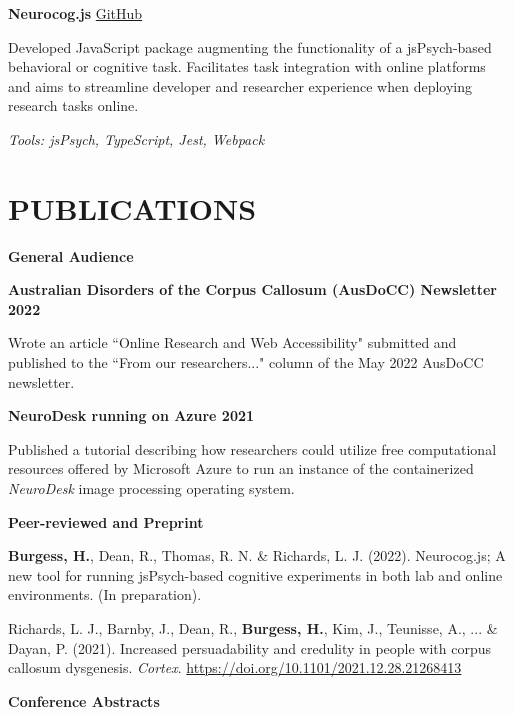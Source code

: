 \documentclass{article}
\begin{document}
  \medbreak

  \textbf{Neurocog.js} \hfill \href{https://github.com/Brain-Development-and-Disorders-Lab/Neurocog.js}{\color{blue}GitHub}

  Developed JavaScript package augmenting the functionality of a jsPsych-based behavioral or cognitive task. Facilitates task integration with online platforms and aims to streamline developer and researcher experience when deploying research tasks online.

  \textit{Tools: jsPsych, TypeScript, Jest, Webpack}

  \pagebreak

  \section*{\centering\uppercase{Publications}}

  {\large\textbf{General Audience}}

  \textbf{Australian Disorders of the Corpus Callosum (AusDoCC) Newsletter \hfill 2022}

  Wrote an article ``Online Research and Web Accessibility" submitted and published to the ``From our researchers..." column of the May 2022 AusDoCC newsletter.

  \medbreak

  \textbf{NeuroDesk running on Azure \hfill 2021}

  Published a tutorial describing how researchers could utilize free computational resources offered by Microsoft Azure to run an instance of the containerized \textit{NeuroDesk} image processing operating system.

  \medbreak

  {\large\textbf{Peer-reviewed and Preprint}}

  \textbf{Burgess, H.}, Dean, R., Thomas, R. N. \& Richards, L. J. (2022). Neurocog.js; A new tool for running jsPsych-based cognitive experiments in both lab and online environments. (In preparation).

  \medbreak

  Richards, L. J., Barnby, J., Dean, R., \textbf{Burgess, H.}, Kim, J., Teunisse, A., ... \& Dayan, P. (2021). Increased persuadability and credulity in people with corpus callosum dysgenesis. \textit{Cortex}.
  \href{https://doi.org/10.1101/2021.12.28.21268413}{\color{blue}https://doi.org/10.1101/2021.12.28.21268413}

  \medbreak

  {\large\textbf{Conference Abstracts}}
\end{document}
